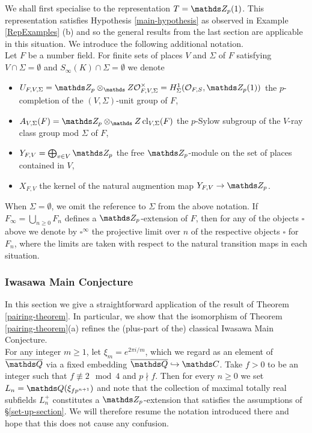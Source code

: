 \documentclass[a4paper, 
headsepline=off, DIV=12, titlepage=false]{scrartcl}
\begin{document}
We shall first specialise to the representation $T = \Z_p (1)$. This representation
satisfies Hypothesis \ref{main-hypothesis} as observed in Example \ref{RepExamples} (b) and so the general results from the last section are applicable in this situation. 
We introduce the following additional notation. \\

Let $F$ be a number field. For finite sets  of places $V$ and $\Sigma$ of $F$ satisfying $V \cap \Sigma = \emptyset$ and $S_\infty (K) \cap \Sigma = \emptyset$ we denote
\begin{itemize}
    \item $U_{F, V, \Sigma} = \Z_p \otimes_\Z \bigO_{F, V, \Sigma}^\times = H^1_\Sigma ( \bigO_{F, S}, \Z_p (1))$ the $p$-completion of the $(V, \Sigma)$-unit group of $F$, 
    \item $A_{V,\Sigma} (F) = \Z_p \otimes_\Z \cl_{V,\Sigma} (F)$ the $p$-Sylow subgroup of the $V$-ray class group mod $\Sigma$ of $F$,
    \item $Y_{F, V} = \bigoplus_{v \in V} \Z_p$ the free $\Z_p$-module on the set of places contained in $V$,
    \item $X_{F, V}$ the kernel of the natural augmention map $Y_{F, V} \to \Z_p$.
\end{itemize}
When $\Sigma = \emptyset$, we omit the reference to $\Sigma$ from the above notation. If $F_\infty = \bigcup_{n \geq 0} F_n$ defines a $\Z_p$-extension of $F$, then for any of the objects $\square$ above we denote by $\square^\infty$ the projective limit over $n$ of the respective objects $\square$ for $F_n$, where the limits are taken with respect to the natural transition maps in each situation.

\subsubsection{Iwasawa Main Conjecture}

In this section we give a straightforward application of the result of Theorem \ref{pairing-theorem}. In particular, we show that the isomorphism of Theorem \ref{pairing-theorem}(a) refines the (plus-part of the) classical Iwasawa Main Conjecture.\\

For any integer $m \geq 1$, let $\xi_m = e^{2 \pi i / m}$, which we regard as an element of $\overline{\Q}$ via a fixed embedding $\overline{\Q} \hookrightarrow \C$. 
Take $f >0$ to be an integer such that $f \not \equiv 2 \mod 4$ and
$p \nmid f$. Then for every $n \geq 0$ we set $L_n = \Q (\xi_{f p^{n + 1}})$ and note that the collection of maximal totally real subfields $L_n^+$ constitutes a $\Z_p$-extension that satisfies the assumptions of \S\ref{set-up-section}. We will therefore resume the notation introduced there and hope that this does not cause any confusion. \\
\end{document}

